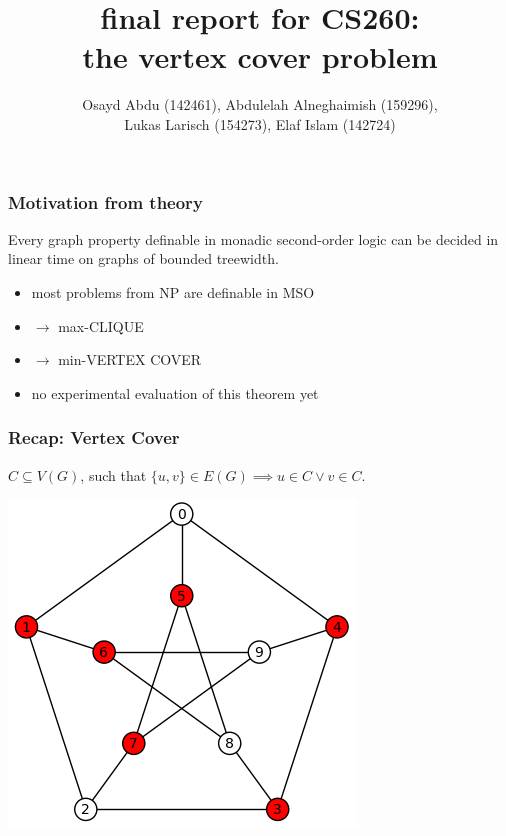 \documentclass[11pt]{beamer}
\title{final report for CS260: \\ \normalsize the vertex cover problem}
\author{Osayd Abdu (142461), Abdulelah Alneghaimish (159296), \\ Lukas Larisch (154273), Elaf Islam (142724)}
\date{}
\begin{document}
\begin{frame}

\maketitle

\end{frame}

\begin{frame}
\frametitle{Motivation from theory}

\begin{theorem}[Courcelle, 1990]
Every graph property definable in monadic second-order logic can be decided in linear time on graphs of bounded treewidth.
\end{theorem}

\begin{itemize}
\item most problems from NP are definable in MSO
\item [] $\rightarrow$ max-CLIQUE
\item [] $\rightarrow$ min-VERTEX COVER
\item no experimental evaluation of this theorem yet
\end{itemize}

\end{frame}




\begin{frame}
\frametitle{Recap: Vertex Cover}

$C \subseteq V(G)$, such that $\{u, v\} \in E(G) \implies u \in C \lor v \in C$. \\

\begin{center}

{
\centering
\includegraphics[scale=0.5]{example_cover}
}

\end{center}

\end{frame}
\end{document}
